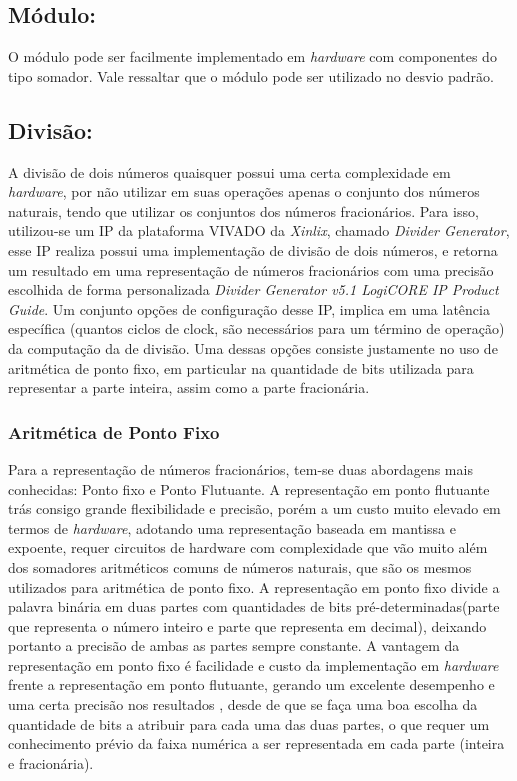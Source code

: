 \subsection{Módulo:} O módulo pode ser facilmente implementado em \textit{hardware} com componentes do tipo somador. Vale ressaltar que o módulo pode ser utilizado no desvio padrão.
\subsection{Divisão:} A divisão de dois números quaisquer possui uma certa complexidade em \textit{hardware}, por não utilizar em suas operações apenas o conjunto dos números naturais, tendo que utilizar os conjuntos dos números fracionários. Para isso, utilizou-se um IP da plataforma VIVADO da \textit{Xinlix}, chamado \textit{Divider Generator}, esse IP realiza possui uma implementação de divisão de dois números, e retorna um resultado em uma representação de números fracionários com uma precisão escolhida de forma personalizada \textit{Divider Generator v5.1 LogiCORE IP Product Guide}. Um conjunto opções de configuração desse IP, implica em uma latência específica (quantos ciclos de clock, são necessários para um término de operação) da computação da de divisão. Uma dessas opções consiste justamente no uso de aritmética de ponto fixo, em particular na quantidade de bits utilizada para representar a parte inteira, assim como a parte fracionária.

\subsubsection{Aritmética de Ponto Fixo} 	

Para a representação de números fracionários, tem-se duas abordagens mais conhecidas: Ponto fixo e Ponto Flutuante. A representação em ponto flutuante trás consigo grande flexibilidade e precisão, porém a um custo muito elevado em termos de \textit{hardware}, adotando uma representação baseada em mantissa e expoente, requer circuitos de hardware com complexidade que vão muito além dos somadores aritméticos comuns de números naturais, que são os mesmos utilizados para aritmética de ponto fixo. A representação em ponto fixo divide a palavra binária em duas partes com quantidades de bits pré-determinadas(parte que representa o número inteiro e parte que representa em decimal), deixando portanto a precisão de ambas as partes sempre constante. A vantagem da representação em ponto fixo é facilidade e custo da implementação em \textit{hardware} frente a representação em ponto flutuante, gerando um excelente desempenho e uma certa precisão nos resultados \cite{woods2008reconfigurable}, desde de que se faça uma boa escolha da quantidade de bits a atribuir para cada uma das duas partes, o que requer um conhecimento prévio da faixa numérica a ser representada em cada parte (inteira e fracionária).


